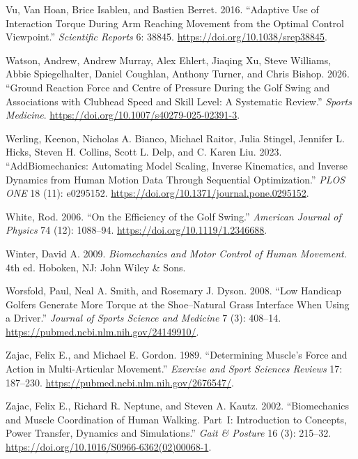 \documentclass[
  letterpaper,
]{report}
\newlength{\cslhangindent}
\newenvironment{CSLReferences}[2] %
 {\begin{list}{}{%
  \setlength{\itemindent}{0pt}
  \setlength{\leftmargin}{0pt}
  \setlength{\parsep}{0pt}
  \ifodd #1
   \setlength{\leftmargin}{\cslhangindent}
   \setlength{\itemindent}{-1\cslhangindent}
  \fi
  \setlength{\itemsep}{#2\baselineskip}}}
 {\end{list}}
\begin{document}
\begin{CSLReferences}{1}{0}
Vu, Van Hoan, Brice Isableu, and Bastien Berret. 2016. {``Adaptive Use
of Interaction Torque During Arm Reaching Movement from the Optimal
Control Viewpoint.''} \emph{Scientific Reports} 6: 38845.
\url{https://doi.org/10.1038/srep38845}.

Watson, Andrew, Andrew Murray, Alex Ehlert, Jiaqing Xu, Steve Williams,
Abbie Spiegelhalter, Daniel Coughlan, Anthony Turner, and Chris Bishop.
2026. {``Ground Reaction Force and Centre of Pressure During the Golf
Swing and Associations with Clubhead Speed and Skill Level: A Systematic
Review.''} \emph{Sports Medicine}.
\url{https://doi.org/10.1007/s40279-025-02391-3}.

Werling, Keenon, Nicholas A. Bianco, Michael Raitor, Julia Stingel,
Jennifer L. Hicks, Steven H. Collins, Scott L. Delp, and C. Karen Liu.
2023. {``{AddBiomechanics}: Automating Model Scaling, Inverse
Kinematics, and Inverse Dynamics from Human Motion Data Through
Sequential Optimization.''} \emph{PLOS ONE} 18 (11): e0295152.
\url{https://doi.org/10.1371/journal.pone.0295152}.

White, Rod. 2006. {``On the Efficiency of the Golf Swing.''}
\emph{American Journal of Physics} 74 (12): 1088--94.
\url{https://doi.org/10.1119/1.2346688}.

Winter, David A. 2009. \emph{Biomechanics and Motor Control of Human
Movement}. 4th ed. Hoboken, NJ: John Wiley \& Sons.

Worsfold, Paul, Neal A. Smith, and Rosemary J. Dyson. 2008. {``Low
Handicap Golfers Generate More Torque at the Shoe--Natural Grass
Interface When Using a Driver.''} \emph{Journal of Sports Science and
Medicine} 7 (3): 408--14.
\url{https://pubmed.ncbi.nlm.nih.gov/24149910/}.

Zajac, Felix E., and Michael E. Gordon. 1989. {``Determining Muscle's
Force and Action in Multi-Articular Movement.''} \emph{Exercise and
Sport Sciences Reviews} 17: 187--230.
\url{https://pubmed.ncbi.nlm.nih.gov/2676547/}.

Zajac, Felix E., Richard R. Neptune, and Steven A. Kautz. 2002.
{``Biomechanics and Muscle Coordination of Human Walking. {P}art~{I}:
Introduction to Concepts, Power Transfer, Dynamics and Simulations.''}
\emph{Gait \& Posture} 16 (3): 215--32.
\url{https://doi.org/10.1016/S0966-6362(02)00068-1}.


\end{CSLReferences}
\end{document}
